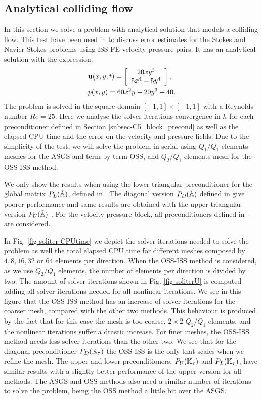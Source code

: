 \subsection{Analytical colliding flow}
\label{subsec-C5_colliding}
In this section we solve a problem with analytical solution that models a colliding flow. This test have been used in \cite{elman_finite_2005} to discuss error estimates for the Stokes and Navier-Stokes problems using ISS FE velocity-pressure pairs. It has an analytical solution with the expression:
\begin{eqnarray}
\label{eq-C5_analytical_u}
&{\bf u}(x,y,t) = \left[ \begin{array}{c}
20xy^3\\
5x^4-5y^4
\end{array}\right],\\
\label{eq-C5_analytical_p}
&p(x,y) = 60x^2y-20y^3+40.
\end{eqnarray}
The problem is solved in the square domain $[-1,1]\times[-1,1]$ with a Reynolds number $Re=25$. Here we analyse the solver iterations convergence in $h$ for each preconditioner defined in Section \ref{subsec-C5_block_precond} as well as the elapsed CPU time and the error on the velocity and pressure fields. Due to the simplicity of the test, we will solve the problem in serial using $Q_1/Q_1$ elements meshes for the ASGS and term-by-term OSS, and $Q_2/Q_1$ elements mesh for the OSS-ISS method.

We only show the results when using the lower-triangular preconditioner for the global matrix $P_L(\tilde{\mathbb{A}})$, defined in . The diagonal version $P_D(\tilde{\mathbb{A}})$ defined in  give poorer performance and same results are obtained with the upper-triangular version $P_U(\tilde{\mathbb{A}})$ . For the velocity-pressure block, all preconditioners defined in - are considered.

In Fig. \ref{fig-soliter-CPUtime} we depict the solver iterations needed to solve the problem as well the total elapsed CPU time for different meshes composed by $4,8,16,32$ or $64$ elements per direction. When the OSS-ISS method is considered, as we use $Q_2/Q_1$ elements, the number of elements per direction is divided by two. The amount of solver iterations shown in Fig. \ref{fig-soliterU} is computed adding all solver iterations needed for all nonlinear iterations. We see in this figure that the OSS-ISS method has an increase of solver iterations for the coarser mesh, compared with the other two methods. This behaviour is produced by the fact that for this case the mesh is too coarse, $2\times2$ $Q_2/Q_1$ elements, and the nonlinear iterations suffer a drastic increase. For finer meshes, the OSS-ISS method needs less solver iterations than the other two. We see that for the diagonal preconditioner $P_D(\mathbb{K}_\tau)$ the OSS-ISS is the only that scales when we refine the mesh. The upper and lower preconditioners, $P_U(\mathbb{K}_\tau)$ and $P_L(\mathbb{K}_\tau)$, have similar results with a slightly better performance of the upper version for all methods. The ASGS and OSS methods also need a similar number of iterations to solve the problem, being the OSS method a little bit over the ASGS.

